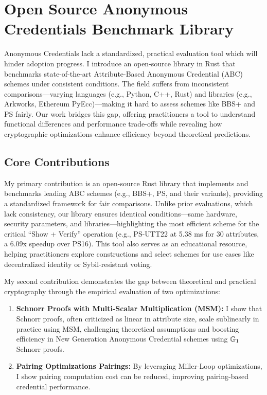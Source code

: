 \chapter{Open Source Anonymous Credentials Benchmark Library}\label{chap6}
Anonymous Credentials lack a standardized, practical evaluation tool which will hinder adoption progress. I introduce an open-source library in Rust that benchmarks state-of-the-art Attribute-Based Anonymous Credential (ABC) schemes under consistent conditions. The field suffers from inconsistent comparisons—varying languages (e.g., Python, C++, Rust) and libraries (e.g., Arkworks, Ethereum PyEcc)—making it hard to assess schemes like BBS+ and PS fairly. Our work bridges this gap, offering practitioners a tool to understand functional differences and performance trade-offs while revealing how cryptographic optimizations enhance efficiency beyond theoretical predictions.

\section{Core Contributions}
My primary contribution is an open-source Rust library that implements and benchmarks leading ABC schemes (e.g., BBS+, PS, and their variants), providing a standardized framework for fair comparisons. Unlike prior evaluations, which lack consistency, our library ensures identical conditions—same hardware, security parameters, and libraries—highlighting the most efficient scheme for the critical ``Show + Verify'' operation (e.g., PS-UTT22 at 5.38 ms for 30 attributes, a 6.09x speedup over PS16). This tool also serves as an educational resource, helping practitioners explore constructions and select schemes for use cases like decentralized identity or Sybil-resistant voting.

My second contribution demonstrates the gap between theoretical and practical cryptography through the empirical evaluation of two optimizations:
\begin{enumerate}
    \item \textbf{Schnorr Proofs with Multi-Scalar Multiplication (MSM):} I show that Schnorr proofs, often criticized as linear in attribute size, scale sublinearly in practice using MSM, challenging theoretical assumptions and boosting efficiency in New Generation Anonymous Credential schemes using $\mathbb{G}_1$ Schnorr proofs.
    
    \item \textbf{Pairing Optimizations Pairings:} By leveraging Miller-Loop optimizations, I show pairing computation cost can be reduced,  improving pairing-based credential performance.
\end{enumerate}

